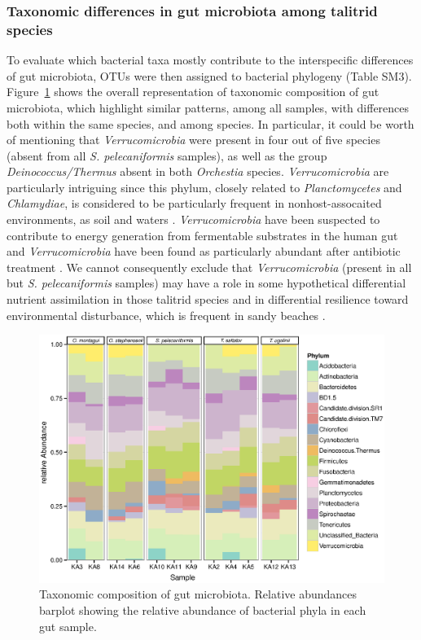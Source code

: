 \subsubsection{Taxonomic differences in gut microbiota among talitrid species}
To evaluate which bacterial taxa mostly contribute to the interspecific differences of gut microbiota, OTUs were then assigned to bacterial phylogeny (Table SM3). Figure~\ref{fig:4talkal} shows the overall representation of taxonomic composition of gut microbiota, which highlight similar patterns, among all samples, with differences both within the same species, and among species. In particular, it could be worth of mentioning that \textit{Verrucomicrobia} were present in four out of five species (absent from all \textit{S. pelecaniformis} samples), as well as the group \textit{Deinococcus/Thermus} absent in both \textit{Orchestia} species. \textit{Verrucomicrobia} are particularly intriguing since this phylum, closely related to \textit{Planctomycetes} and \textit{Chlamydiae}, is considered to be particularly frequent in nonhost-assocaited environments, as soil and waters \cite{buckley2001environmental,freitas2012global}. \textit{Verrucomicrobia} have been suspected to contribute to energy generation from fermentable substrates in the human gut \cite{arumugam2011enterotypes} and \textit{Verrucomicrobia} have been found as particularly abundant after antibiotic treatment \cite{dubourg2013high}. We cannot consequently exclude that \textit{Verrucomicrobia} (present in all but \textit{S. pelecaniformis} samples) may have a role in some hypothetical differential nutrient assimilation in those talitrid species and in differential resilience toward environmental disturbance, which is frequent in sandy beaches \cite{defeo2009threats, ugolini2012sandhoppers, ugolini2005heavy, ugolini2008amphipod, ungherese2010relationship, moffett1998impact}.\\%
\begin{figure}[!tb]
	\centering
	\includegraphics[width=1\textwidth]{./figures/Chapter_6/Figure_4_talkaled.eps}
  	\caption{Taxonomic composition of gut microbiota. Relative abundances barplot showing the relative abundance of bacterial phyla in each gut sample.\label{fig:4talkal}}
\end{figure}%
